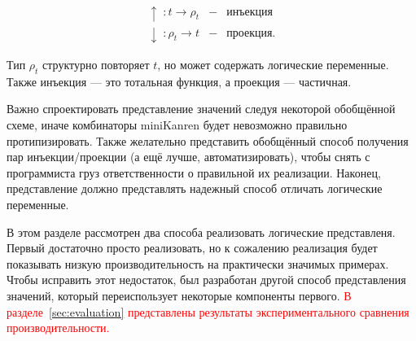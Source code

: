 \[
\begin{array}{rcl}
   \uparrow  \;: t \to \rho_t & - & \mbox{инъекция}\\
   \downarrow\;: \rho_t \to t & - & \mbox{проекция.}
\end{array}
\]

\noindent Тип $\rho_t$ структурно повторяет $t$, но может содержать логические переменные. Также инъекция --- это тотальная функция, а проекция --- частичная.


Важно спроектировать представление значений следуя некоторой обобщённой схеме, иначе комбинаторы miniKanren будет невозможно правильно протипизировать.
Также желательно представить обобщённый способ получения пар инъекции/проекции (а ещё лучше, автоматизировать), чтобы снять с программиста груз ответственности о правильной их реализации. Наконец, представление должно представлять надежный способ отличать логические переменные.


В этом разделе рассмотрен два способа реализовать логические представленя.
Первый достаточно просто реализовать, но к сожалению реализация будет показывать низкую производительность на практически значимых примерах.
Чтобы исправить этот недостаток, был разработан другой способ представления значений, который переиспользует некоторые компоненты первого.
\textcolor{red}{В разделе~\ref{sec:evaluation} представлены результаты экспериментального сравнения производительности.}


